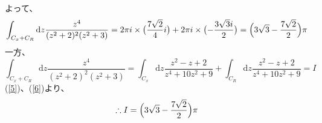 \documentclass[dvipdfmx,a4paper]{jsarticle}
\begin{document}
よって、
\begin{equation}
\label{5}
\int_{C_x + C_R}\mathrm{d}z\frac{z^4}{(z^2+2)^2(z^2+3)} = 2\pi i \times \bigl(\frac{7\sqrt{2}}{4}i\bigr)  + 2\pi i \times \bigl(-\frac{3\sqrt{3}i}{2}\bigr) = \Bigl(3\sqrt{3} - \frac{7\sqrt{2}}{2}\Bigr)\pi
\end{equation}
一方、
\begin{equation}
\label{6}
\int_{C_x + C_R}\mathrm{d}z\frac{z^4}{(z^2+2)^2(z^2+3)} = \int_{C_x}\mathrm{d}z\frac{z^2 - z + 2}{z^4 + 10z^2 + 9} + \int_{C_R}\mathrm{d}z\frac{z^2 - z + 2}{z^4 + 10z^2 + 9} = I
\end{equation}
(\ref{5})、(\ref{6})より、
$$
\therefore I = \Bigl(3\sqrt{3} - \frac{7\sqrt{2}}{2}\Bigr)\pi
$$
\end{document}
